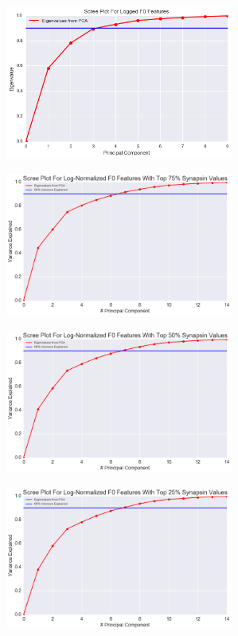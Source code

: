 \documentclass{article}
\begin{document}
\begin{figure}
  \centering
  \begin{subfigure}{0.49\textwidth}
    \label{fig:figure6a}
    \includegraphics[width=75mm]{figures/exploratory/f0_lognormalized_screeplot.png}
    \caption{}
  \end{subfigure}
  \begin{subfigure}{0.49\textwidth}
    \label{fig:figure6b}
    \includegraphics[width=75mm]{figures/exploratory/f0_lognormalized_bottom25_screeplot.png}
    \caption{}
  \end{subfigure}
  \begin{subfigure}{0.49\textwidth}
    \label{fig:figure6c}
    \includegraphics[width=75mm]{figures/exploratory/f0_lognormalized_bottom50_screeplot.png}
    \caption{}
  \end{subfigure}
  \begin{subfigure}{0.49\textwidth}
    \label{fig:figure6d}
    \includegraphics[width=75mm]{figures/exploratory/f0_lognormalized_bottom75_screeplot.png}

\end{subfigure}
\end{figure}
\end{document}
